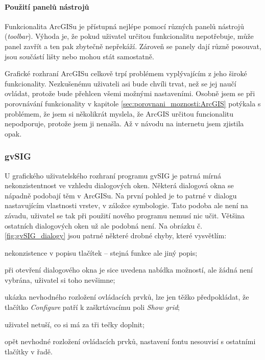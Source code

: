 \documentclass[a4paper,12pt,draft]{article}
\begin{document}
\paragraph*{Použití panelů nástrojů}
Funkcionalita ArcGISu je přístupná nejlépe pomocí různých panelů
nástrojů (\emph{toolbar}). Výhoda je, že pokud uživatel určitou
funkcionalitu nepotřebuje, může panel zavřít a ten pak zbytečně
nepřekáží. Zároveň se panely dají různě posouvat, jsou součástí
lišty nebo mohou stát samostatně.


Grafické rozhraní ArcGISu celkově trpí problémem vyplývajícím z jeho
široké funkcionality. Nezkušenému uživateli asi bude chvíli trvat,
než se jej naučí ovládat, protože bude přehlcen všemi možnými
nastaveními. Osobně jsem se při porovnávání funkcionality v kapitole
\ref{sec:porovnani_moznosti:ArcGIS} potýkala s problémem, že jsem si
několikrát myslela, že ArcGIS určitou funcionalitu nepodporuje, protože
jsem ji nenašla. Až v návodu na internetu jsem zjistila opak.



\subsubsection{gvSIG}
U grafického uživatelského rozhraní programu gvSIG je patrná mírná
nekonzistentnost ve vzhledu dialogových oken. Některá dialogová okna se
nápadně podobají těm v ArcGISu. Na první pohled je to patrné v dialogu
nastavujícím vlastnosti vrstev, v záložce symbologie. Tato podoba ale
není na závadu, uživatel se tak při použití nového programu nemusí
nic učit. Většina ostatních dialogových oken už ale podobná není. Na
obrázku č. \ref{fig:gvSIG_dialogy} jsou patrné některé drobné chyby,
které vysvětlím:
\begin{inparaenum}[\itshape 1\upshape)]
\item nekonzistence v popisu tlačítek -- stejná funkce ale jiný popis;
\item při otevření dialogového okna je sice uvedena nabídka možností,
ale žádná není vybrána, uživatel si toho nevšimne;
\item ukázka nevhodného rozložení ovládacích prvků, lze jen těžko
předpokládat, že tlačítko \emph{Configure} patří k zaškrtávacímu
poli \emph{Show grid};
\item uživatel netuší, co si má za tři tečky doplnit;
\item opět nevhodné rozložení ovládacích prvků, nastavení fontu
nesouvisí s ostatními tlačítky v řadě.
\end{inparaenum}
\end{document}
